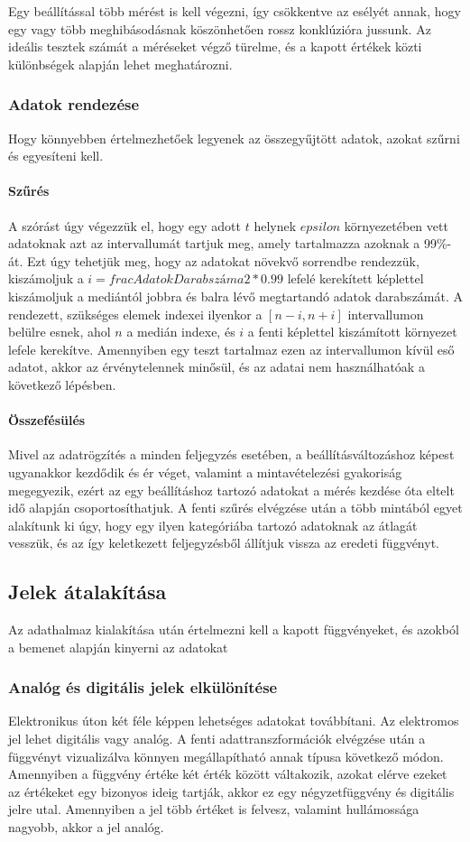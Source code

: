 Egy beállítással több mérést is kell végezni, így csökkentve az esélyét annak, hogy egy vagy több meghibásodásnak köszönhetően rossz konklúzióra jussunk. Az ideális tesztek számát a méréseket végző türelme, és a kapott értékek közti különbségek alapján lehet meghatározni.

\subsubsection{Adatok rendezése}
Hogy könnyebben értelmezhetőek legyenek az összegyűjtött adatok, azokat szűrni és egyesíteni kell.
\paragraph{Szűrés}
A szórást úgy végezzük el, hogy egy adott $t$ helynek $epsilon$ környezetében vett adatoknak azt az intervallumát tartjuk meg, amely tartalmazza azoknak a 99\%-át. Ezt úgy tehetjük meg, hogy az adatokat növekvő sorrendbe rendezzük, kiszámoljuk a $i = frac{AdatokDarabszáma}{2}*0.99$ lefelé kerekített képlettel kiszámoljuk a mediántól jobbra és balra lévő megtartandó adatok darabszámát. A rendezett, szükséges elemek indexei ilyenkor a $[n-i,n+i]$ intervallumon belülre esnek, ahol $n$ a medián indexe, és $i$ a fenti képlettel kiszámított környezet lefele kerekítve. Amennyiben egy teszt tartalmaz ezen az intervallumon kívül eső adatot, akkor az érvénytelennek minősül, és az adatai nem használhatóak a következő lépésben.
\paragraph{Összefésülés}
Mivel az adatrögzítés a minden feljegyzés esetében, a beállításváltozáshoz képest ugyanakkor kezdődik és ér véget, valamint a mintavételezési gyakoriság megegyezik, ezért az egy beállításhoz tartozó adatokat a mérés kezdése óta eltelt idő alapján csoportosíthatjuk. A fenti szűrés elvégzése után a több mintából egyet alakítunk ki úgy, hogy egy ilyen kategóriába tartozó adatoknak az átlagát vesszük, és az így keletkezett feljegyzésből állítjuk vissza az eredeti függvényt.

\subsection{Jelek átalakítása}
Az adathalmaz kialakítása után értelmezni kell a kapott függvényeket, és azokból a bemenet alapján kinyerni az adatokat
\subsubsection{Analóg és digitális jelek elkülönítése}
Elektronikus úton két féle képpen lehetséges adatokat továbbítani. Az elektromos jel lehet digitális vagy analóg. A fenti adattranszformációk elvégzése után a függvényt vizualizálva könnyen megállapítható annak típusa következő módon. Amennyiben a függvény értéke két érték között váltakozik, azokat elérve ezeket az értékeket egy bizonyos ideig tartják, akkor ez egy négyzetfüggvény és digitális jelre utal. Amennyiben a jel több értéket is felvesz, valamint hullámossága nagyobb, akkor a jel analóg.

